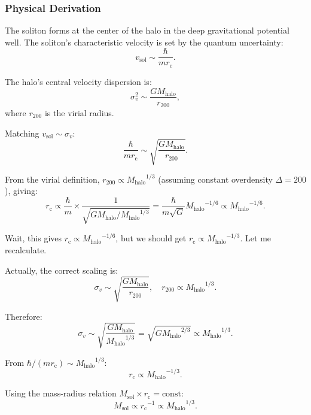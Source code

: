 \documentclass[11pt,a4paper]{article}
\newcommand{\Msol}{\ensuremath{M_{\mathrm{sol}}}}
\newcommand{\Mhalo}{\ensuremath{M_{\mathrm{halo}}}}
\newcommand{\rc}{\ensuremath{r_{\mathrm{c}}}}
\theoremstyle{definition}
\theoremstyle{remark}
\begin{document}
\subsubsection{Physical Derivation}

The soliton forms at the center of the halo in the deep gravitational potential well. The soliton's characteristic velocity is set by the quantum uncertainty:
\begin{equation}
v_{\mathrm{sol}} \sim \frac{\hbar}{m\rc}.
\end{equation}

The halo's central velocity dispersion is:
\begin{equation}
\sigma_v^2 \sim \frac{G\Mhalo}{r_{200}},
\end{equation}
where $r_{200}$ is the virial radius.

Matching $v_{\mathrm{sol}} \sim \sigma_v$:
\begin{equation}
\frac{\hbar}{m\rc} \sim \sqrt{\frac{G\Mhalo}{r_{200}}}.
\end{equation}

From the virial definition, $r_{200} \propto \Mhalo^{1/3}$ (assuming constant overdensity $\Delta = 200$), giving:
\begin{equation}
\rc \propto \frac{\hbar}{m} \times \frac{1}{\sqrt{G\Mhalo/\Mhalo^{1/3}}} = \frac{\hbar}{m\sqrt{G}} \Mhalo^{-1/6} \propto \Mhalo^{-1/6}.
\end{equation}

Wait, this gives $\rc \propto \Mhalo^{-1/6}$, but we should get $\rc \propto \Mhalo^{-1/3}$. Let me recalculate.

Actually, the correct scaling is:
\begin{equation}
\sigma_v \sim \sqrt{\frac{G\Mhalo}{r_{200}}}, \quad r_{200} \propto \Mhalo^{1/3}.
\end{equation}

Therefore:
\begin{equation}
\sigma_v \sim \sqrt{\frac{G\Mhalo}{\Mhalo^{1/3}}} = \sqrt{G\Mhalo^{2/3}} \propto \Mhalo^{1/3}.
\end{equation}

From $\hbar/(m\rc) \sim \Mhalo^{1/3}$:
\begin{equation}
\rc \propto \Mhalo^{-1/3}.
\end{equation}

Using the mass-radius relation $\Msol \times \rc = \text{const}$:
\begin{equation}
\Msol \propto \rc^{-1} \propto \Mhalo^{1/3}.
\end{equation}
\end{document}
